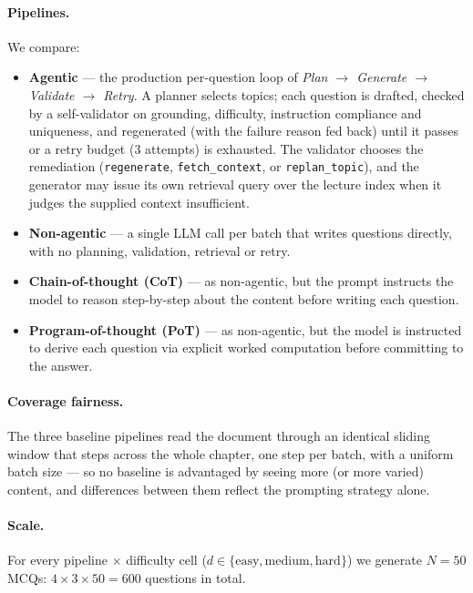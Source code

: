 \paragraph{Pipelines.} We compare:
\begin{itemize}
  \item \textbf{Agentic} --- the production per-question loop of
        \emph{Plan $\rightarrow$ Generate $\rightarrow$ Validate $\rightarrow$
        Retry}. A planner selects topics; each question is drafted, checked by
        a self-validator on grounding, difficulty, instruction compliance and
        uniqueness, and regenerated (with the failure reason fed back) until it
        passes or a retry budget (3 attempts) is exhausted. The validator
        chooses the remediation (\texttt{regenerate}, \texttt{fetch\_context},
        or \texttt{replan\_topic}), and the generator may issue its own
        retrieval query over the lecture index when it judges the supplied
        context insufficient.
  \item \textbf{Non-agentic} --- a single LLM call per batch that writes
        questions directly, with no planning, validation, retrieval or retry.
  \item \textbf{Chain-of-thought (CoT)} --- as non-agentic, but the prompt
        instructs the model to reason step-by-step about the content before
        writing each question.
  \item \textbf{Program-of-thought (PoT)} --- as non-agentic, but the model is
        instructed to derive each question via explicit worked
        computation before committing to the answer.
\end{itemize}

\paragraph{Coverage fairness.} The three baseline pipelines read the document
through an identical sliding window that steps across the whole chapter, one
step per batch, with a uniform batch size --- so no baseline is advantaged by
seeing more (or more varied) content, and differences between them reflect the
prompting strategy alone.

\paragraph{Scale.} For every pipeline $\times$ difficulty cell
($d\in\{\text{easy},\text{medium},\text{hard}\}$) we generate $N{=}50$ MCQs:
$4\times3\times50 = 600$ questions in total.

